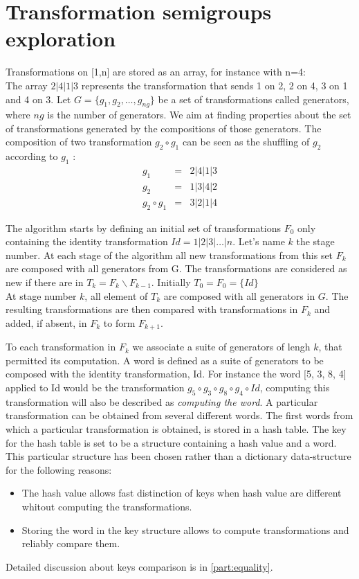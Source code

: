{\section{Transformation semigroups exploration}
\label{note}
Transformations on [1,n] are stored as an array, for instance with n=4:\\
The array $2|4|1|3$ represents the transformation that sends 1 on 2, 2 on 4, 3 on 1 and 4 on 3.
Let $G=\{g_1, g_2, \dots, g_{ng}\}$ be a set of transformations called generators, where $ng$ is the number of generators. 
We aim at finding properties about the set of transformations generated by the compositions of those generators.
The composition of two transformation $g_2\circ g_1$ can be seen as the shuffling of $g_2$ according to $g_1$ :
\begin{eqnarray*}
g_1 &=& 2|4|1|3\\
g_2 &=& 1|3|4|2\\
g_2\circ g_1 &=& 3|2|1|4
\end{eqnarray*}

The algorithm starts by defining an initial set of transformations $F_0$ only containing the identity transformation $Id = 1|2|3|\dots|n$.
Let's name $k$ the stage number.
At each stage of the algorithm all new transformations from this set $F_k$ are composed with all generators from G.
The transformations are considered as new if there are in $T_k=F_k \backslash F_{k-1}$.
Initially $T_0 = F_0 = \{Id\}$\\
At stage number $k$, all element of $T_k$ are composed with all generators in $G$. 
The resulting transformations are then compared with transformations in $F_k$ and added, if absent, in $F_k$ to form $F_{k+1}$.

To each transformation in $F_k$ we associate a suite of generators of lengh $k$, that permitted its computation.
A word is defined as a suite of generators to be composed with the identity transformation, Id.
For instance the word [5, 3, 8, 4] applied to Id would be the transformation $g_5 \circ g_3 \circ g_8 \circ g_4 \circ Id$, 
computing this transformation will also be described as \emph{computing the word}.
A particular transformation can be obtained from several different words.
The first words from which a particular transformation is obtained, is stored in a hash table.
The key for the hash table is set to be a structure containing a hash value and a word. 
This particular structure has been chosen rather than a dictionary data-structure for the following reasons:
\begin{itemize}
\item The hash value allows fast distinction of keys when hash value are different whitout computing the transformations.
\item Storing the word in the key structure allows to compute transformations and reliably compare them.
\end{itemize}
Detailed discussion about keys comparison is in \autoref{part:equality}.

}

